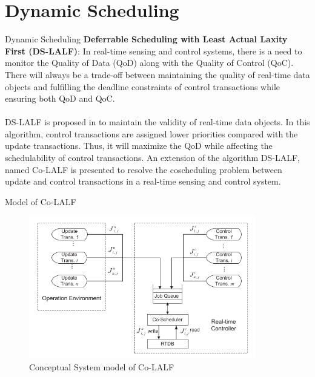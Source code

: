 \documentclass{beamer}
\begin{document}
\section{Dynamic Scheduling}
\begin{frame}{Dynamic Scheduling}
\textbf{Deferrable Scheduling with Least Actual Laxity First (DS-LALF)}: In real-time sensing and control systems, there is a need to monitor the Quality of Data (QoD) along with the Quality of Control (QoC). There will always be a trade-off between maintaining the quality of real-time data objects and fulfilling the deadline constraints
of control transactions while ensuring both QoD and QoC.\\~\\

DS-LALF is proposed in \cite{ds-lalf} to maintain the validity of real-time data objects. In this algorithm, control transactions are assigned lower priorities compared with the update transactions. Thus, it will maximize the QoD while affecting the schedulability of control transactions. An extension of the algorithm DS-LALF, named Co-LALF is presented to resolve the coscheduling problem between update and control transactions in a real-time sensing and control
system. 
\end{frame}

\begin{frame}{Model of Co-LALF}
\begin{figure}[h]
    \centering
    \includegraphics[width=0.88\textwidth]{images/ds-lalf.png}
    \caption{Conceptual System model of Co-LALF}
\end{figure}
\end{frame}
\end{document}
